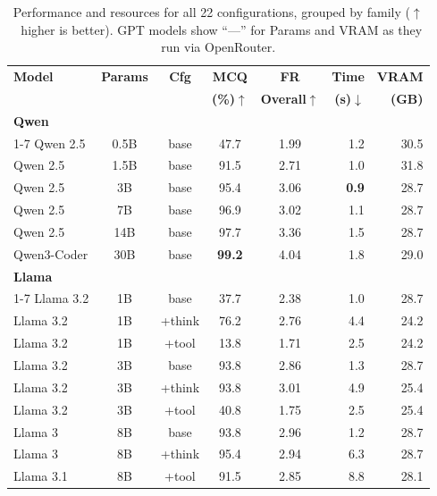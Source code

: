 \documentclass[conference]{IEEEtran}
\begin{document}
\begin{table}[t]
  \caption{Performance and resources for all 22 configurations, grouped by family ($\uparrow$~higher is better). GPT models show ``---'' for Params and VRAM as they run via OpenRouter.}
  \label{tab:overall}
  \centering
  \scriptsize
  {\setlength{\tabcolsep}{3.5pt}
  \begin{tabular}{@{}lccccrr@{}}
    \toprule
    \textbf{Model} & \textbf{Params} & \textbf{Cfg} & \textbf{MCQ} & \textbf{FR} & \textbf{Time} & \textbf{VRAM} \\
    & & & \textbf{(\%)}$\uparrow$ & \textbf{Overall}$\uparrow$ & \textbf{(s)}$\downarrow$ & \textbf{(GB)} \\
    \midrule
    \multicolumn{7}{l}{\textbf{Qwen}} \\
    \cmidrule(lr){1-7}
    Qwen 2.5      & 0.5B & base   & 47.7          & 1.99 & 1.2          & 30.5 \\
    Qwen 2.5      & 1.5B & base   & 91.5          & 2.71 & 1.0          & 31.8 \\
    Qwen 2.5      & 3B   & base   & 95.4          & 3.06 & \textbf{0.9} & 28.7 \\
    Qwen 2.5      & 7B   & base   & 96.9          & 3.02 & 1.1          & 28.7 \\
    Qwen 2.5      & 14B  & base   & 97.7          & 3.36 & 1.5          & 28.7 \\
    Qwen3-Coder   & 30B  & base   & \textbf{99.2} & 4.04 & 1.8          & 29.0 \\
    \midrule
    \multicolumn{7}{l}{\textbf{Llama}} \\
    \cmidrule(lr){1-7}
    Llama 3.2     & 1B  & base    & 37.7          & 2.38 & 1.0  & 28.7 \\
    Llama 3.2     & 1B  & +think  & 76.2          & 2.76 & 4.4  & 24.2 \\
    Llama 3.2     & 1B  & +tool   & 13.8          & 1.71 & 2.5  & 24.2 \\
    Llama 3.2     & 3B  & base    & 93.8          & 2.86 & 1.3  & 28.7 \\
    Llama 3.2     & 3B  & +think  & 93.8          & 3.01 & 4.9  & 25.4 \\
    Llama 3.2     & 3B  & +tool   & 40.8          & 1.75 & 2.5  & 25.4 \\
    Llama 3       & 8B  & base    & 93.8          & 2.96 & 1.2  & 28.7 \\
    Llama 3       & 8B  & +think  & 95.4          & 2.94 & 6.3  & 28.7 \\
    Llama 3.1     & 8B  & +tool   & 91.5          & 2.85 & 8.8  & 28.1 \\

\end{tabular}}
\end{table}
\end{document}
